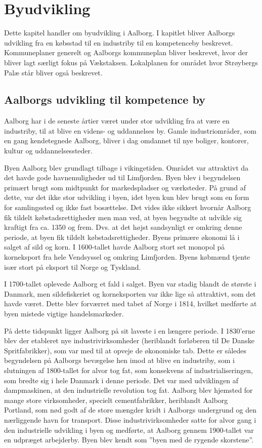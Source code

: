 \chapter{Byudvikling}
Dette kapitel handler om byudvikling i Aalborg. I kapitlet bliver Aalborgs udvikling fra en købsstad til en industriby til en kompetenceby beskrevet. Kommuneplaner generelt og  Aalborgs kommuneplan bliver beskrevet, hvor der bliver lagt særligt fokus på Vækstaksen. Lokalplanen for området hvor Strøybergs Palæ står bliver også beskrevet.

\section{Aalborgs udvikling til kompetence by}
Aalborg har i de seneste årtier været under stor udvikling fra at være en industriby, til at blive en videns- og uddannelses by.  Gamle industriområder, som en gang kendetegnede Aalborg, bliver i dag omdannet til nye boliger, kontorer, kultur og uddannelsessteder.

Byen Aalborg blev grundlagt tilbage i vikingetiden. Området var attraktivt da det havde gode havnemuligheder ud til Limfjorden. Byen blev i begyndelsen primært brugt som midtpunkt for markedspladser og værksteder. På grund af dette, var det ikke stor udvikling i byen, idet byen kun blev brugt som en form for samlingssted og ikke fast bosættelse. Det vides ikke sikkert hvornår Aalborg fik tildelt købstadsrettigheder men man ved, at byen begyndte at udvikle sig kraftigt fra ca. 1350 og frem. Dvs. at det højst sandsynligt er omkring denne periode, at byen fik tildelt købstadsrettigheder. Byens primære økonomi lå i salget af sild og korn. I 1600-tallet havde Aalborg stort set monopol på korneksport fra hele Vendsyssel og omkring Limfjorden. Byens købmænd tjente især stort på eksport til Norge og Tyskland.

I 1700-tallet oplevede Aalborg et fald i salget. Byen var stadig blandt de største i Danmark, men sildefiskeriet og korneksporten var ikke lige så attraktivt, som det havde været. Dette blev forværret med tabet af Norge i 1814, hvilket medførte at byen mistede vigtige handelsmarkeder.

På dette tidspunkt ligger Aalborg på sit laveste i en længere periode. I 1830’erne blev der etableret nye industrivirksomheder (heriblandt forløberen til De Danske Spritfabrikker), som var med til at opveje de økonomiske tab. Dette er således begyndelsen på Aalborgs bevægelse hen imod at blive en industriby, som i slutningen af 1800-tallet for alvor tog fat, som konsekvens af industrialiseringen, som bredte sig i hele Danmark i denne periode. Det var med udviklingen af dampmaskinen, at den industrielle revolution tog fat. Aalborg blev hjemsted for mange store virksomheder, specielt cementfabrikker, heriblandt Aalborg Portland, som nød godt af de store mængder kridt i Aalborgs undergrund og den nærliggende havn for transport. Disse industrivirksomheder satte for alvor gang i den industrielle udvikling i byen og medførte, at Aalborg gennem 1900-tallet var en udpræget arbejderby. Byen blev kendt som ”byen med de rygende skorstene”. 

